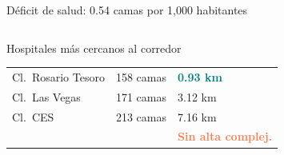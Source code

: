 \documentclass[aspectratio=169, 11pt]{beamer}
\newcommand{\highlight}[1]{\textcolor{teal}{\textbf{#1}}}
\newcommand{\danger}[1]{\textcolor{coral}{\textbf{#1}}}
\newcommand{\src}[1]{\par\vspace{2pt}{\tiny\textcolor{slate}{Fuente: #1}}}
\begin{document}
{\begin{frame}{Déficit de salud: 0.54 camas por 1,000 habitantes}
\begin{columns}[T]
\vspace{2pt}
\begin{exampleblock}{\small Hospitales más cercanos al corredor}
\tiny
\begin{tabular}{@{}lrl@{}}
Cl.\ Rosario Tesoro & 158 camas & \highlight{0.93 km} \\
Cl.\ Las Vegas & 171 camas & 3.12 km \\
Cl.\ CES & 213 camas & 7.16 km \\
\midrule
& & \danger{Sin alta complej.} \\
\end{tabular}
\end{exampleblock}
\end{columns}

\src{REPS (s2ru-bqt6), DENSURBAM (URBAM-EAFIT/AMVA), DANE proyecciones}
\end{frame}
}
\end{document}
